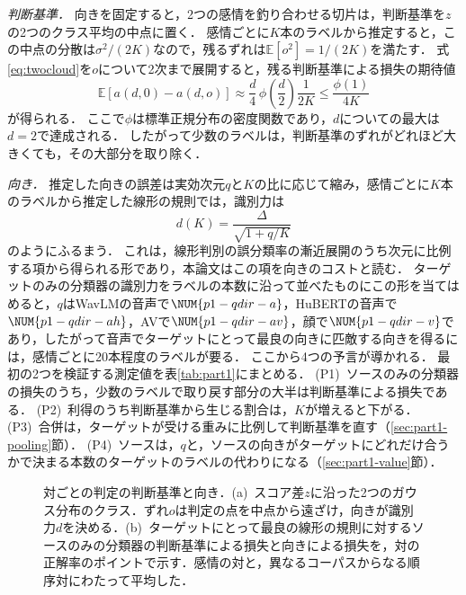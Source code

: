 \emph{判断基準．}
向きを固定すると，2つの感情を釣り合わせる切片は，判断基準を$z$の2つのクラス平均の中点に置く．
感情ごとに$K$本のラベルから推定すると，この中点の分散は$\sigma^2/(2K)$なので，残るずれは$\mathbb{E}[o^2] = 1/(2K)$を満たす．
式\eqref{eq:twocloud}を$o$について2次まで展開すると，残る判断基準による損失の期待値
\begin{equation}
\label{eq:thrcost}
\mathbb{E}\left[a(d, 0) - a(d, o)\right] \approx \frac{d}{4}\,\phi\!\left(\frac{d}{2}\right)\frac{1}{2K} \le \frac{\phi(1)}{4K}
\end{equation}
が得られる．
ここで$\phi$は標準正規分布の密度関数であり，$d$についての最大は$d=2$で達成される．
したがって少数のラベルは，判断基準のずれがどれほど大きくても，その大部分を取り除く．

\emph{向き．}
推定した向きの誤差は実効次元$q$と$K$の比に応じて縮み，感情ごとに$K$本のラベルから推定した線形の規則では，識別力は
\begin{equation}
\label{eq:dircost}
d(K) = \frac{\Delta}{\sqrt{1 + q/K}}
\end{equation}
のようにふるまう．
これは，線形判別の誤分類率の漸近展開のうち次元に比例する項から得られる形であり，本論文はこの項を向きのコストと読む\cite{okamoto1963asymptotic,raudys1998intrinsic}．
ターゲットのみの分類器の識別力をラベルの本数に沿って並べたものにこの形を当てはめると，$q$はWavLMの音声で$\NUM{p1-qdir-a}$，HuBERTの音声で$\NUM{p1-qdir-ah}$，AVで$\NUM{p1-qdir-av}$，顔で$\NUM{p1-qdir-v}$であり，したがって音声でターゲットにとって最良の向きに匹敵する向きを得るには，感情ごとに20本程度のラベルが要る．
ここから4つの予言が導かれる．
最初の2つを検証する測定値を表\ref{tab:part1}にまとめる．
(P1)~ソースのみの分類器の損失のうち，少数のラベルで取り戻す部分の大半は判断基準による損失である．
(P2)~利得のうち判断基準から生じる割合は，$K$が増えると下がる．
(P3)~合併は，ターゲットが受ける重みに比例して判断基準を直す（\ref{sec:part1-pooling}節）．
(P4)~ソースは，$q$と，ソースの向きがターゲットにどれだけ合うかで決まる本数のターゲットのラベルの代わりになる（\ref{sec:part1-value}節）．

\begin{figure}[t]
\centering
{}
\caption{対ごとの判定の判断基準と向き．(a)~スコア差$z$に沿った2つのガウス分布のクラス．ずれ$o$は判定の点を中点から遠ざけ，向きが識別力$d$を決める．(b)~ターゲットにとって最良の線形の規則に対するソースのみの分類器の判断基準による損失と向きによる損失を，対の正解率のポイントで示す．感情の対と，異なるコーパスからなる順序対にわたって平均した．}
\label{fig:twocloud}
\end{figure}

